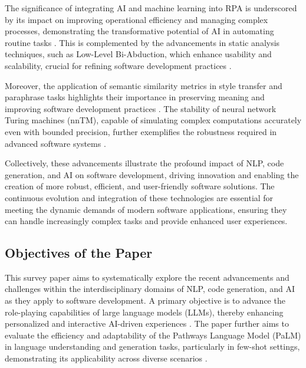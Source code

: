 The significance of integrating AI and machine learning into RPA is underscored by its impact on improving operational efficiency and managing complex processes, demonstrating the transformative potential of AI in automating routine tasks \cite{pandy2024advancementsroboticsprocessautomation}. This is complemented by the advancements in static analysis techniques, such as Low-Level Bi-Abduction, which enhance usability and scalability, crucial for refining software development practices \cite{holk2022lowlevelbiabduction}.



Moreover, the application of semantic similarity metrics in style transfer and paraphrase tasks highlights their importance in preserving meaning and improving software development practices \cite{yamshchikov2020styletransferparaphraselookingsensible}. The stability of neural network Turing machines (nnTM), capable of simulating complex computations accurately even with bounded precision, further exemplifies the robustness required in advanced software systems \cite{stogin2022provablystableneuralnetwork}.



Collectively, these advancements illustrate the profound impact of NLP, code generation, and AI on software development, driving innovation and enabling the creation of more robust, efficient, and user-friendly software solutions. The continuous evolution and integration of these technologies are essential for meeting the dynamic demands of modern software applications, ensuring they can handle increasingly complex tasks and provide enhanced user experiences.



\subsection{Objectives of the Paper} \label{subsec:Objectives of the Paper}

This survey paper aims to systematically explore the recent advancements and challenges within the interdisciplinary domains of NLP, code generation, and AI as they apply to software development. A primary objective is to advance the role-playing capabilities of large language models (LLMs), thereby enhancing personalized and interactive AI-driven experiences \cite{tao2024rolecraftglmadvancingpersonalizedroleplaying}. The paper further aims to evaluate the efficiency and adaptability of the Pathways Language Model (PaLM) in language understanding and generation tasks, particularly in few-shot settings, demonstrating its applicability across diverse scenarios \cite{chowdhery2023palm}.



